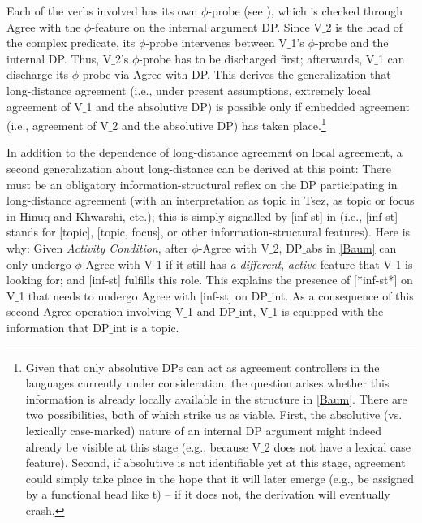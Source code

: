 \documentclass[output=paper
,modfonts
,nonflat]{langsci/langscibook}
\begin{document}
Each of the verbs involved has its own $\phi$-probe
(see \cite{Bejar&Rezac:09}), which is checked through Agree with the
$\phi$-feature on the internal argument DP. Since V$\_$2 is the head of
the complex predicate, its $\phi$-probe intervenes between V$\_$1's
$\phi$-probe and the internal DP.  Thus, V$\_$2's $\phi$-probe has to be
discharged first; afterwards, V$\_$1 can discharge its  $\phi$-probe via
Agree with DP. This
derives the generalization that long-distance agreement (i.e., under
present assumptions, extremely local agreement of V$\_$1 and the absolutive DP)
is possible only if embedded agreement (i.e., agreement of V$\_$2 and the
absolutive DP) has taken place.\footnote{Given that only absolutive
  DPs can act as agreement controllers in the languages currently
  under consideration, the question arises whether this information is
  already locally available in the structure in \ref{Baum}. There are
  two possibilities, both of which strike us as viable. First, the
  absolutive (vs. lexically case-marked) nature of an internal DP
  argument might indeed already be visible at this stage (e.g.,
  because V$\_$2 does not have a lexical case feature). Second, if
  absolutive is not identifiable yet at this stage, agreement could
  simply take place in the hope that it will later emerge (e.g., be
  assigned by a functional head like t) -- if it does not, the
  derivation will eventually crash.}

In addition to the dependence of long-distance agreement on local
agreement, a second generalization about long-distance can be derived
at this point: There must be an obligatory information-structural
reflex on the DP participating in long-distance agreement (with an
interpretation as topic in Tsez, as topic or focus in Hinuq and
Khwarshi, etc.); this is simply signalled by [inf-st] in \Last (i.e.,
[inf-st] stands for [topic], [topic, focus], or other
information-structural features). Here is why: 
Given   {\it Activity Condition}, after $\phi$-Agree
  with V$\_$2, DP$\_${abs} in \ref{Baum} can only undergo $\phi$-Agree
  with V$\_$1 if it still has {\it a different}, {\it active} feature
  that V$\_$1 is looking for; and [inf-st] fulfills this role.
 This explains the presence of [*inf-st*] on V$\_$1 that needs to undergo
 Agree with [inf-st] on  DP$\_${int}. As a consequence of this second
 Agree operation involving V$\_$1 and DP$\_${int}, V$\_$1 is equipped with the
 information that DP$\_${int} is a topic. 
\end{document}
